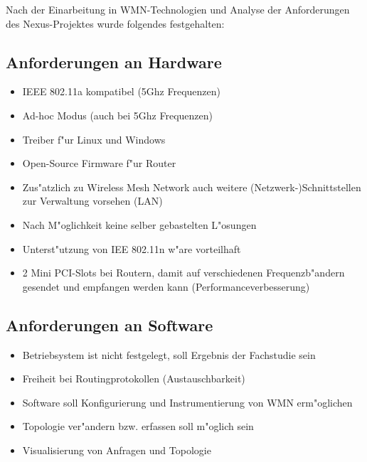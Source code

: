 Nach der Einarbeitung in WMN-Technologien und 
Analyse der Anforderungen des Nexus-Projektes
wurde folgendes festgehalten:

\subsection{Anforderungen an Hardware}
\begin{itemize}
	\item IEEE 802.11a kompatibel (5Ghz Frequenzen) 
	\item Ad-hoc Modus (auch bei 5Ghz Frequenzen) 
	\item Treiber f"ur Linux und Windows
	\item Open-Source Firmware f"ur Router
	\item Zus"atzlich zu Wireless Mesh Network auch weitere
	(Netzwerk-)Schnittstellen zur Verwaltung vorsehen (LAN)
	\item Nach M"oglichkeit keine selber gebastelten L"osungen 
	\item Unterst"utzung von IEE 802.11n w"are vorteilhaft
	\item 2 Mini PCI-Slots bei Routern, damit auf verschiedenen
	Frequenzb"andern gesendet und empfangen werden kann
	(Performanceverbesserung) 
\end{itemize}

\subsection{Anforderungen an Software}
\begin{itemize}
	\item Betriebsystem ist nicht festgelegt,
	soll Ergebnis der Fachstudie sein
	\item Freiheit bei Routingprotokollen (Austauschbarkeit)
	\item Software soll Konfigurierung und Instrumentierung von WMN
	erm"oglichen
	\item Topologie ver"andern bzw. erfassen soll m"oglich sein
	\item Visualisierung von Anfragen und Topologie 
\end{itemize}

